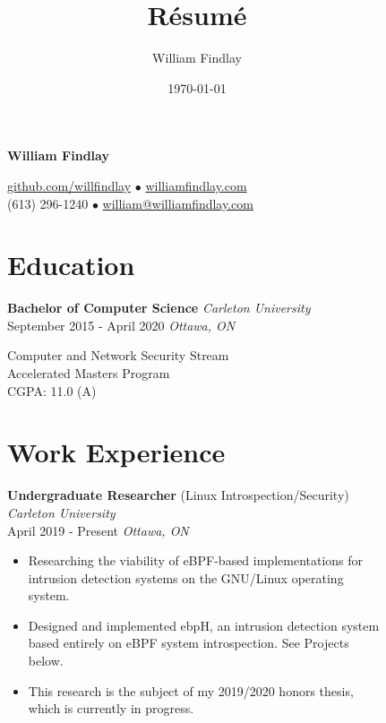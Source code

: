\documentclass[]{article}
\title{Résumé}
\author{William Findlay}
\date{\today}
\theoremstyle{plain}
\theoremstyle{remark}
\theoremstyle{definition}
\renewcommand{\maketitle}{\relax}
\begin{document}
\maketitle

\begin{figure}
\small
\begin{minipage}[t]{0.65\textwidth}
\begin{center}
{\Huge\bfseries William Findlay}

\color{gray}

\href{https://www.github.com/willfindlay}{\color{gray}github.com/willfindlay} $\bullet$ \href{http://www.williamfindlay.com}{\color{gray}williamfindlay.com}\\
{\color{gray}(613) 296-1240} $\bullet$ \href{mailto:william@williamfindlay.com}{\color{gray}william@williamfindlay.com}
\end{center}

\color{gray}

\section{Education}
\color{black}
\textbf{Bachelor of Computer Science} \hfill \emph{Carleton University}\\
{September 2015 - April 2020} \hfill\emph {Ottawa, ON}
\color{gray}

Computer and Network Security Stream\\
Accelerated Masters Program\\
CGPA: 11.0 (A)

\section{Work Experience}

\color{black}
\textbf{Undergraduate Researcher} (Linux Introspection/Security) \hfill \emph{Carleton University}\\
April 2019 - Present \hfill\emph {Ottawa, ON}
\color{gray}
\begin{itemize}[itemsep=0em]
\item Researching the viability of eBPF-based implementations for intrusion detection systems on the GNU/Linux operating system.
\item Designed and implemented ebpH, an intrusion detection system based entirely on eBPF system introspection. See Projects below.
\item This research is the subject of my 2019/2020 honors thesis, which is currently in progress.
\end{itemize}


\end{minipage}
\end{figure}
\end{document}
